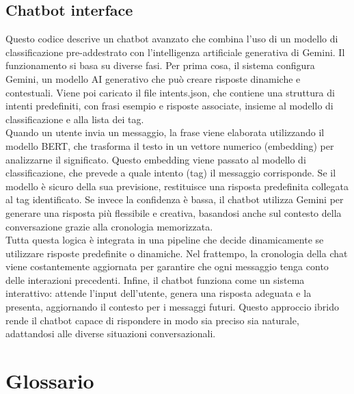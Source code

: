 \documentclass[12pt, letterpaper]{article}
\begin{document}
\subsection{Chatbot interface}
Questo codice descrive un chatbot avanzato che combina l'uso di un modello di classificazione pre-addestrato con l'intelligenza artificiale generativa di Gemini. Il funzionamento si basa su diverse fasi. Per prima cosa, il sistema configura Gemini, un modello AI generativo che può creare risposte dinamiche e contestuali. Viene poi caricato il file intents.json, che contiene una struttura di intenti predefiniti, con frasi esempio e risposte associate, insieme al modello di classificazione e alla lista dei tag.\\
Quando un utente invia un messaggio, la frase viene elaborata utilizzando il modello BERT, che trasforma il testo in un vettore numerico (embedding) per analizzarne il significato. Questo embedding viene passato al modello di classificazione, che prevede a quale intento (tag) il messaggio corrisponde. Se il modello è sicuro della sua previsione, restituisce una risposta predefinita collegata al tag identificato. Se invece la confidenza è bassa, il chatbot utilizza Gemini per generare una risposta più flessibile e creativa, basandosi anche sul contesto della conversazione grazie alla cronologia memorizzata.\\
Tutta questa logica è integrata in una pipeline che decide dinamicamente se utilizzare risposte predefinite o dinamiche. Nel frattempo, la cronologia della chat viene costantemente aggiornata per garantire che ogni messaggio tenga conto delle interazioni precedenti. Infine, il chatbot funziona come un sistema interattivo: attende l'input dell'utente, genera una risposta adeguata e la presenta, aggiornando il contesto per i messaggi futuri. Questo approccio ibrido rende il chatbot capace di rispondere in modo sia preciso sia naturale, adattandosi alle diverse situazioni conversazionali.

\section{Glossario}
\end{document}
